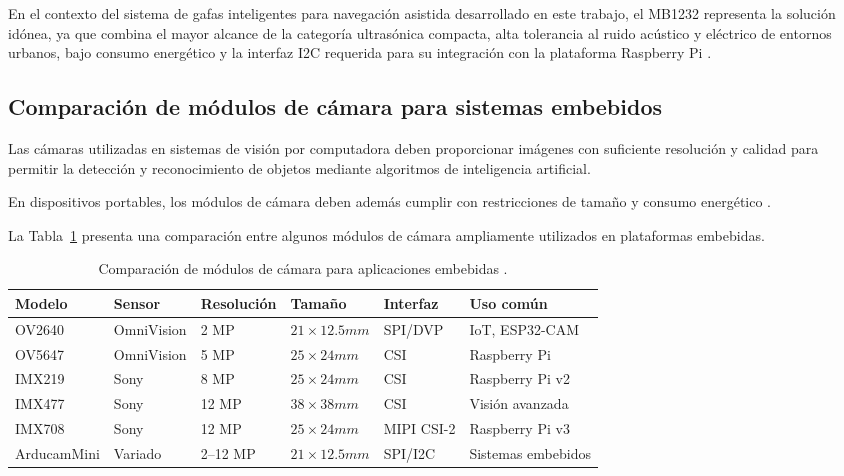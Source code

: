 En el contexto del sistema de gafas inteligentes para navegación asistida desarrollado en este trabajo, el MB1232 representa la solución idónea, ya que combina el mayor alcance de la categoría ultrasónica compacta, alta tolerancia al ruido acústico y eléctrico de entornos urbanos, bajo consumo energético y la interfaz I2C requerida para su integración con la plataforma Raspberry Pi \cite{mb1232_datasheet}.

\subsection{Comparación de módulos de cámara para sistemas embebidos}

Las cámaras utilizadas en sistemas de visión por computadora deben proporcionar imágenes con suficiente resolución y calidad para permitir la detección y reconocimiento de objetos mediante algoritmos de inteligencia artificial.

En dispositivos portables, los módulos de cámara deben además cumplir con restricciones de tamaño y consumo energético \cite{raspberrypi_camera_doc3}.

La Tabla~\ref{tabla_camaras} presenta una comparación entre algunos módulos de cámara ampliamente utilizados en plataformas embebidas.

\begin{table}[H]
\centering
\begin{tabular}{llllll}
\hline
Modelo & Sensor & Resolución & Tamaño & Interfaz & Uso común \\
\hline
OV2640 \cite{ov2640_datasheet}              & OmniVision & 2 MP  & $21 \times 12.5mm$ & SPI/DVP  & IoT, ESP32-CAM \\
OV5647 \cite{raspberrypi_camera_doc}        & OmniVision & 5 MP  & $25 \times 24mm$     & CSI      & Raspberry Pi \\
IMX219 \cite{arducam_imx219}               & Sony       & 8 MP  & $25 \times 24mm$     & CSI      & Raspberry Pi v2 \\
IMX477 \cite{raspberrypi_camera_doc}        & Sony       & 12 MP & $38 \times 38mm$       & CSI      & Visión avanzada \\
IMX708 \cite{raspberrypi_camera_doc3} & Sony & 12 MP & $25 \times 24mm$ & MIPI CSI-2 & Raspberry Pi v3 \\
ArducamMini \cite{arducam_imx219}          & Variado    & 2--12 MP & $21 \times 12.5mm$ & SPI/I2C & Sistemas embebidos \\
\hline
\end{tabular}
\caption{Comparación de módulos de cámara para aplicaciones embebidas \cite{ov2640_datasheet, raspberrypi_camera_doc, raspberrypi_camera_doc3,arducam_imx219}.}
\label{tabla_camaras}
\end{table}

